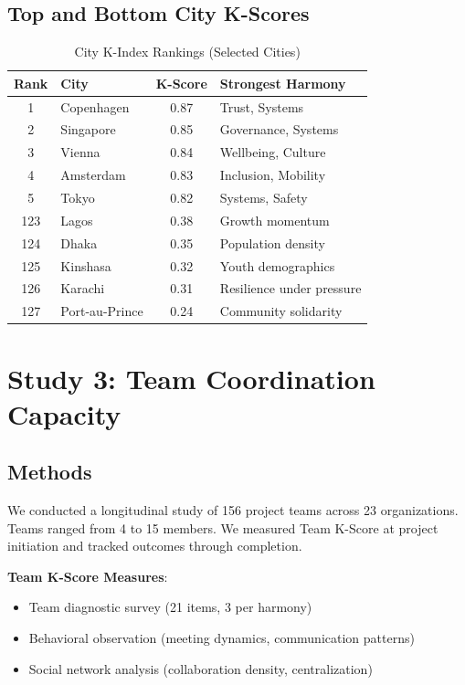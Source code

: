\documentclass[12pt,a4paper]{article}
\begin{document}
\subsection{Top and Bottom City K-Scores}

\begin{table}[H]
\centering
\caption{City K-Index Rankings (Selected Cities)}
\label{tab:city_rankings}
\begin{tabular}{clcl}
\toprule
\textbf{Rank} & \textbf{City} & \textbf{K-Score} & \textbf{Strongest Harmony} \\
\midrule
1 & Copenhagen & 0.87 & Trust, Systems \\
2 & Singapore & 0.85 & Governance, Systems \\
3 & Vienna & 0.84 & Wellbeing, Culture \\
4 & Amsterdam & 0.83 & Inclusion, Mobility \\
5 & Tokyo & 0.82 & Systems, Safety \\
\midrule
123 & Lagos & 0.38 & Growth momentum \\
124 & Dhaka & 0.35 & Population density \\
125 & Kinshasa & 0.32 & Youth demographics \\
126 & Karachi & 0.31 & Resilience under pressure \\
127 & Port-au-Prince & 0.24 & Community solidarity \\
\bottomrule
\end{tabular}
\end{table}

\section{Study 3: Team Coordination Capacity}
\label{sec:study3}

\subsection{Methods}

We conducted a longitudinal study of 156 project teams across 23 organizations. Teams ranged from 4 to 15 members. We measured Team K-Score at project initiation and tracked outcomes through completion.

\textbf{Team K-Score Measures}:
\begin{itemize}
    \item Team diagnostic survey (21 items, 3 per harmony)
    \item Behavioral observation (meeting dynamics, communication patterns)
    \item Social network analysis (collaboration density, centralization)
\end{itemize}
\end{document}
